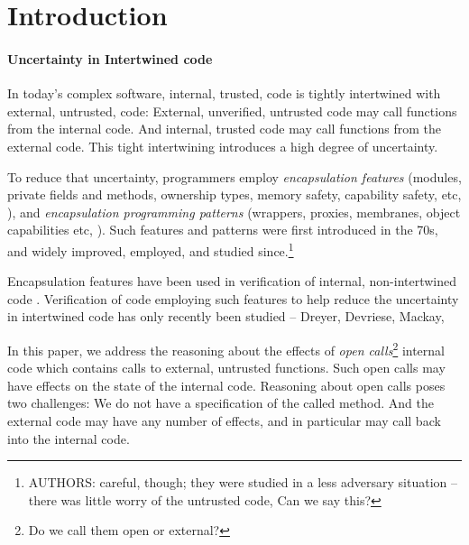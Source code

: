 \section{Introduction}
\label{s:intro}

\newcommand{\Tamed}{Tamed\xspace}
\newcommand{\tamed}{tamed\xspace}
\newcommand{\tame}{tame\xspace}
\newcommand{\tames}{tames\xspace}
\newcommand{\Taming}{Taming\xspace}
\newcommand{\taming}{taming\xspace}

\paragraph{Uncertainty in Intertwined code} In today's complex software, internal, trusted, code  is tightly intertwined  with external, untrusted, code:
External, unverified, untrusted code may call functions from the internal code.
And internal, trusted code may call functions from the  external  code.
This tight intertwining   introduces a high degree of uncertainty.

To  reduce  that uncertainty, programmers employ  
\emph{encapsulation  features}
 (\eg   modules, private fields and methods, ownership types, memory safety, capability safety,  etc, \cite{private}),
and \emph{encapsulation  programming patterns} (\eg wrappers, proxies, membranes, object capabilities etc, \cite{mebranes}).
Such  features and patterns were first introduced in the 70s, and widely improved, employed, and studied since.\footnote{AUTHORS: careful, though; they were studied in a less adversary situation -- there was little worry of the untrusted code, Can we say this?}

Encapsulation features have been  used in   verification of internal, non-intertwined code  \cite{Muller, Leino}.
Verification of code employing such  features to help reduce the uncertainty in intertwined code
has only recently  been studied \cite{xxx} -- Dreyer, Devriese, Mackay,  

%
In this paper, we address the reasoning about the effects of  \emph{open calls}\footnote{Do we call them open or external?} 
\ie  internal code which contains calls to external, untrusted functions.
Such open calls may have effects on the state of the internal code. 
Reasoning about  open calls poses two challenges:  
We do not have a specification of the called method. 
And the external code may have any number of effects, and in particular may call back into the internal code.

